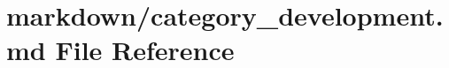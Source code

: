 \hypertarget{category__development_8md}{}\section{markdown/category\+\_\+development.md File Reference}
\label{category__development_8md}
